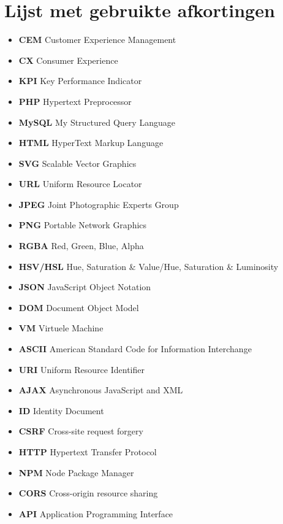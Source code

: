 \chapter{Lijst met gebruikte afkortingen}

\begin{itemize}
\item[] \textbf{CEM} \qquad Customer Experience Management
\item[] \textbf{CX} \qquad Consumer Experience
\item[] \textbf{KPI} \qquad Key Performance Indicator
\item[] \textbf{PHP} \qquad Hypertext Preprocessor
\item[] \textbf{MySQL} \qquad My Structured Query Language
\item[] \textbf{HTML} \qquad HyperText Markup Language
\item[] \textbf{SVG} \qquad Scalable Vector Graphics
\item[] \textbf{URL} \qquad Uniform Resource Locator
\item[] \textbf{JPEG} \qquad Joint Photographic Experts Group
\item[] \textbf{PNG} \qquad Portable Network Graphics
\item[] \textbf{RGBA} \qquad Red, Green, Blue, Alpha
\item[] \textbf{HSV/HSL} \qquad Hue, Saturation \& Value/Hue, Saturation \& Luminosity
\item[] \textbf{JSON} \qquad JavaScript Object Notation
\item[] \textbf{DOM} \qquad Document Object Model
\item[] \textbf{VM} \qquad Virtuele Machine
\item[] \textbf{ASCII} \qquad American Standard Code for Information Interchange
\item[] \textbf{URI} \qquad Uniform Resource Identifier
\item[] \textbf{AJAX} \qquad Asynchronous JavaScript and XML
\item[] \textbf{ID} \qquad Identity Document
\item[] \textbf{CSRF} \qquad Cross-site request forgery
\item[] \textbf{HTTP} \qquad Hypertext Transfer Protocol
\item[] \textbf{NPM} \qquad Node Package Manager
\item[] \textbf{CORS} \qquad Cross-origin resource sharing
\item[] \textbf{API} \qquad Application Programming Interface

\end{itemize}	


